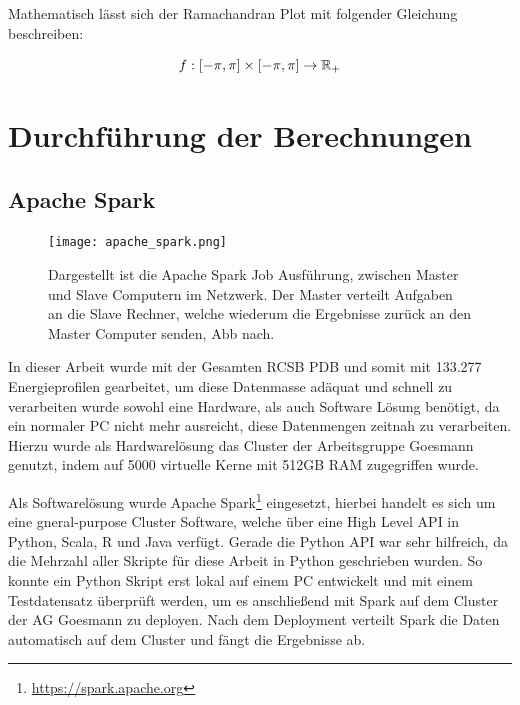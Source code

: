 Mathematisch lässt sich der Ramachandran Plot mit folgender Gleichung beschreiben:

\begin{equation}
    f : [-\pi,\pi]\times[-\pi,\pi] \rightarrow \mathbb{R}_{+}
    \label{eq:rama_eq}
\end{equation}


\newpage
\section{Durchführung der Berechnungen}


\subsection{Apache Spark}

\begin{figure}
\texttt{[image: apache\_spark.png]}
\caption{Dargestellt ist die Apache Spark Job Ausführung, zwischen Master und Slave Computern im Netzwerk. Der Master verteilt Aufgaben an die Slave Rechner, welche wiederum die Ergebnisse zurück an den Master Computer senden, \ac{Abb} nach\protect\footnotemark.}
\label{fig:apache_spark}
\end{figure}

In dieser Arbeit wurde mit der Gesamten RCSB \ac{PDB} und somit mit 133.277 Energieprofilen gearbeitet, um diese Datenmasse adäquat und schnell zu verarbeiten wurde sowohl eine Hardware, als auch Software Lösung benötigt, da ein normaler PC nicht mehr ausreicht, diese Datenmengen zeitnah zu verarbeiten. Hierzu wurde als Hardwarelösung das Cluster der Arbeitsgruppe Goesmann genutzt, indem auf 5000 virtuelle Kerne mit 512GB RAM zugegriffen wurde. 

Als Softwarelösung wurde Apache Spark\footnote{\url{https://spark.apache.org}} eingesetzt, hierbei handelt es sich um eine gneral-purpose Cluster Software, welche über eine High Level API in Python, Scala, R und Java verfügt. Gerade die Python API war sehr hilfreich, da die Mehrzahl aller Skripte für diese Arbeit in Python geschrieben wurden. So konnte ein Python Skript erst lokal auf einem PC entwickelt und mit einem Testdatensatz überprüft werden, um es anschließend mit Spark auf dem Cluster der AG Goesmann zu deployen. Nach dem Deployment verteilt Spark die Daten automatisch auf dem Cluster und fängt die Ergebnisse ab. 

